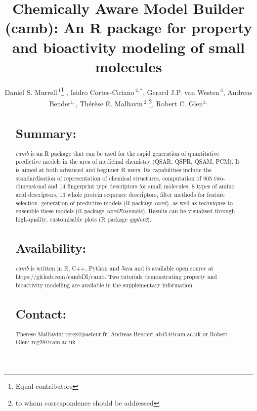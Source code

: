 \documentclass{bioinfo}
\begin{document}

\title{Chemically Aware Model Builder (camb): An R package for property and bioactivity modeling of small molecules}
\author[Murrell \& Cortes-Ciriano \it{et~al}]{Daniel S. Murrell\,$^{1}$\footnote{Equal contributors} , Isidro Cortes-Ciriano\,$^{2,*}$, Gerard J.P. van Westen\,$^{3}$, Andreas Bender$^{1,}$, Th\'er\`ese E. Malliavin\,$^{2,}$\footnote{to whom correspondence should be addressed},  Robert C. Glen$^{1,}$\dag}
\address{$^{1}$Unilever Centre for Molecular Science Informatics, Department of Chemistry, University of Cambridge, Lensfield Road, Cambridge CB2 1EW, United Kingdom.\\
$^{2}$Unite de Bioinformatique Structurale, Institut Pasteur and CNRS UMR 3825, Structural Biology and Chemistry Department, 25, rue Dr. Roux, 75 724 Paris, France.\\
$^{3}$European Molecular Biology Laboratory European Bioinformatics Institute Wellcome Trust Genome Campus, Hinxton, United Kingdom.}

\maketitle

\begin{abstract}
\section{Summary:}
{\it camb} is an R package that can be used for the rapid generation of quantitative predictive models in the area of medicinal chemistry (QSAR, QSPR, QSAM, PCM). It is aimed at both advanced and beginner R users.
Its capabilities include the standardisation of representation of chemical structures, computation of 905 two-dimensional and 14 fingerprint type descriptors for small molecules, 8 types of amino acid descriptors, 13 whole protein sequence descriptors, filter methods for feature selection, generation of predictive models (R package {\it caret}), as well as techniques to ensemble these models (R package {\it caretEnsemble}).
Results can be visualised through high-quality, customisable plots (R package {\it ggplot2}).
\section{Availability:} {\it camb} is written in R, C++, Python and Java and is available open source
at https://github.com/cambDI/camb.
Two tutorials demonstrating property and bioactivity modelling are available in the supplementary information.\\
\section{Contact:} Therese Malliavin: terez@pasteur.fr, Andreas Bender: ab454@cam.ac.uk or Robert Glen: rcg28@cam.ac.uk
\end{abstract}
\end{document}
